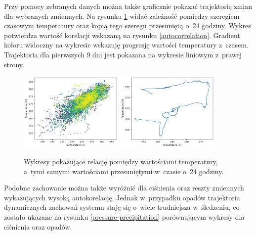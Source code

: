 Przy pomocy zebranych danych można także graficznie pokazać trajektorię zmian dla wybranych zmiennych. Na rysunku \ref{temperature} widać zależność pomiędzy szeregiem czasowym temperatury
oraz kopią tego szeregu przesuniętą o~24 godziny. Wykres potwierdza wartość korelacji 
wskazaną na rysunku \ref{autocorrelation}. Gradient koloru widoczny na wykresie wskazuję
progresję wartości temperatury z~czasem. Trajektoria dla pierwszych 9 dni jest pokazana 
na wykresie liniowym z~prawej strony. 

\begin{figure}[H]
    \centering
    \includegraphics[width=0.45\textwidth]{images/temperature_scatter.png}
    \includegraphics[width=0.45\textwidth]{images/temperature_line.png}
    \caption[Korelacja temperatury]{Wykresy pokazujące relację pomiędzy wartościami temperatury, a~tymi samymi 
    wartościami przesuniętymi w~czasie o~24 godziny.}
    \label{temperature}
\end{figure}

Podobne zachowanie można także wyróżnić dla ciśnienia oraz reszty zmiennych wykazujących 
wysoką autokorelację. Jednak w~przypadku opadów trajektoria dynamicznych zachowań systemu
staję się o~wiele trudniejsza w~śledzeniu, co zostało ukazane na rysunku \ref{pressure-precipitation} porównującym wykresy dla ciśnienia oraz opadów. 


